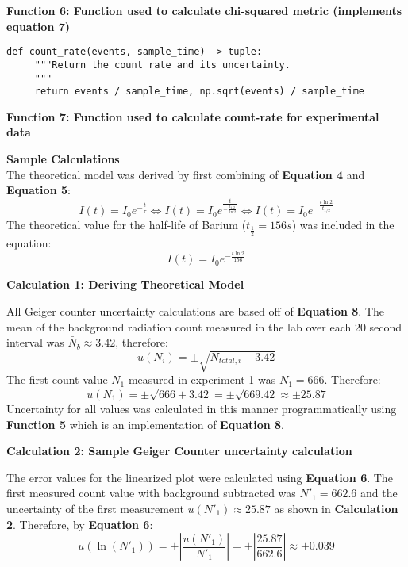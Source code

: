 \documentclass[
	letterpaper, %
	10pt, %
]{CSUniSchoolLabReport}
\begin{document}
\begin{center}
	\textbf{Function 6: Function used to calculate chi-squared metric (implements equation 7)}
\end{center}
\vspace{5pt}
\begin{verbatim}
def count_rate(events, sample_time) -> tuple:
     """Return the count rate and its uncertainty.
     """
     return events / sample_time, np.sqrt(events) / sample_time
\end{verbatim}
\begin{center}
	\textbf{Function 7: Function used to calculate count-rate for experimental data}
\end{center}
\newpage %
{\Large\textbf{Sample Calculations}}
\vspace{20pt}\\
The theoretical model was derived by first combining of \textbf{Equation 4} and \textbf{Equation 5}:
$$I(t) = I_0e^{-\frac{t}{\tau}} \iff I(t) = I_0e^{\frac{t}{-\frac{t_{1/2}}{\ln{2}}}} \iff I(t) = I_0e^{-\frac{t\ln{2}}{t_{1/2}}}$$
The theoretical value for the half-life of Barium ($t_{\frac{1}{2}} = 156s$) was included in the equation:
$$I(t) = I_0e^{-\frac{t\ln{2}}{156}}$$
\begin{center}
	\textbf{Calculation 1: Deriving Theoretical Model}
\end{center}
\vspace{10pt}
All Geiger counter uncertainty calculations are based off of \textbf{Equation 8}. The mean of the background radiation count measured in the lab over each 20 second interval was $\bar{N}_b \approx 3.42$, therefore:
$$u(N_i) = \pm\sqrt{N_{total, i} + 3.42}$$
The first count value $N_1$ measured in experiment 1 was $N_1= 666$. Therefore:
$$u(N_1) = \pm\sqrt{666 + 3.42} = \pm\sqrt{669.42} \approx \pm25.87$$
Uncertainty for all values was calculated in this manner programmatically using \textbf{Function 5} which is an implementation of \textbf{Equation 8}.
\begin{center}
	\textbf{Calculation 2: Sample Geiger Counter uncertainty calculation}
\end{center}
\vspace{10pt}
The error values for the linearized plot were calculated using \textbf{Equation 6}. The first measured count value with background subtracted was $N'_{1} = 662.6$ and the uncertainty of the first measurement $u(N'_1) \approx 25.87$ as shown in \textbf{Calculation 2}. Therefore, by \textbf{Equation 6}:
$$u(\ln(N'_1))= \pm\left|\frac{u(N'_1)}{N'_1}\right|= \pm\left|\frac{25.87}{662.6}\right| \approx \pm0.039$$
\end{document}

